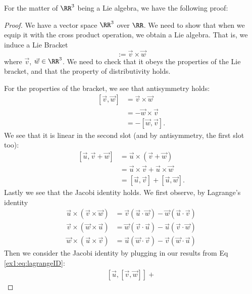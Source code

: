 \answer For the matter of
$\RR^{3}$ being a Lie algebra, we have the following proof:
\begin{proof}
We have a vector space $\RR^{3}$ over $\RR$. We need to
show that when we equip it with the cross product operation, we
obtain a Lie algebra. That is, we induce a Lie Bracket
\begin{equation}
[\vec{v},\vec{w}]:=\vec{v}\times\vec{w}
\end{equation}
where $\vec{v}$, $\vec{w}\in\RR^{3}$. We need to check that
it obeys the properties of the Lie bracket, and that the property
of distributivity holds. 

For the properties of the bracket, we see that antisymmetry
holds:
\begin{subequations}
\begin{align}
[\vec{v},\vec{w}]&=\vec{v}\times\vec{w}\\
&=-\vec{w}\times\vec{v}\\
&=-[\vec{w},\vec{v}].
\end{align}
\end{subequations}
We see that it is linear in the second slot (and by antisymmetry,
the first slot too):
\begin{subequations}
\begin{align}
[\vec{u},\vec{v}+\vec{w}]&=\vec{u}\times(\vec{v}+\vec{w})\\
&=\vec{u}\times\vec{v}+\vec{u}\times\vec{w}\\
&=[\vec{u},\vec{v}]+[\vec{u},\vec{w}].
\end{align}
\end{subequations}
Lastly we see that the Jacobi identity holds. We first observe, by
Lagrange's identity
\begin{subequations}\label{ex1:eq:lagrangeID}
\begin{align}
\vec{u}\times(\vec{v}\times\vec{w}) &= \vec{v}(\vec{u}\cdot\vec{w})-\vec{w}(\vec{u}\cdot\vec{v})\\
\vec{v}\times(\vec{w}\times\vec{u}) &= \vec{w}(\vec{v}\cdot\vec{u})-\vec{u}(\vec{v}\cdot\vec{w})\\
\vec{w}\times(\vec{u}\times\vec{v}) &= \vec{u}(\vec{w}\cdot\vec{v})-\vec{v}(\vec{w}\cdot\vec{u})
\end{align}
\end{subequations}
Then we consider the Jacobi identity by plugging in our results
from Eq \eqref{ex1:eq:lagrangeID}:
\begin{subequations}
\begin{align}
\left[\vec{u},[\vec{v},\vec{w}]\right] +

\end{align}
\end{subequations}
\end{proof}
